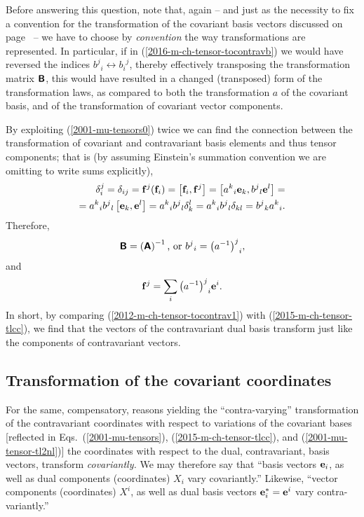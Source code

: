 Before answering this question, note that, again -- and just as the necessity to fix a convention for the transformation of the covariant basis vectors discussed on page~\pageref{2016-m-ch-fdvs-oic} --
we have to choose by {\em convention} the way transformations are represented.
In particular,
if in (\ref{2016-m-ch-tensor-tocontravb}) we would have reversed the indices ${b^j}_i \leftrightarrow {b_i}^j$, thereby effectively transposing the transformation matrix  $ \textsf{\textbf{B}} $,
this would have resulted in a changed (transposed) form of the transformation laws,
as compared to both the transformation $a$ of the covariant basis, and of the transformation of covariant vector components.

By exploiting (\ref{2001-mu-tensors0}) twice we can find the connection between
the transformation of covariant and contravariant basis elements and thus
tensor components; that is (by assuming Einstein's summation convention we are omitting to write sums explicitly),
\begin{equation}
\begin{split}
\delta_i^j= \delta_{ij}=
{\bf f}^j({\bf f}_i) =
\left[{\bf f}_i , {\bf f}^j \right]=
\left[ {a^k}_i {\bf e}_k ,  {b^j}_l {\bf e}^l \right] =
\\
=
{a^k}_i {b^j}_l  \left[ {\bf e}_k , {\bf e}^l \right]
={a^k}_i {b^j}_l   \delta_k^l
={a^k}_i {b^j}_l   \delta_{kl}
={b^j}_k {a^k}_i  .
\end{split}
\end{equation}
Therefore,
\begin{equation}
\textsf{\textbf{B}}
=\left( \textsf{\textbf{A}} \right)^{-1}
\textrm{, or }
{b^j}_i =  {\left( a^{-1} \right)^j}_i,
\label{2012-m-ch-tensor-tocontrav}
\end{equation}
and
\begin{equation}
{\bf f}^j=
\sum_i{\left( a^{-1}\right)^j}_i{\bf e}^i
.
\label{2012-m-ch-tensor-tocontrav1}
\end{equation}
In short, by comparing (\ref{2012-m-ch-tensor-tocontrav1})  with (\ref{2015-m-ch-tensor-tlcc}), we find that the vectors of the contravariant dual basis transform just like the components of contravariant vectors.

\subsection{Transformation of the covariant coordinates}

For the same, compensatory, reasons yielding the ``contra-varying'' transformation of the contravariant coordinates
with respect to variations of the covariant bases [reflected in Eqs.~(\ref{2001-mu-tensors}), (\ref{2015-m-ch-tensor-tlcc}), and (\ref{2001-mu-tensor-tl2nl})]
the coordinates with respect to the dual, contravariant, basis vectors, transform {\em covariantly.}
We may therefore say that
``basis vectors ${\bf e}_i$, as well as dual components (coordinates) $X_i$ vary covariantly.''
Likewise,
``vector components (coordinates) $X^i$, as well as dual basis vectors ${\bf e}^\ast_i= {\bf e}^i$ vary contra-variantly.''


